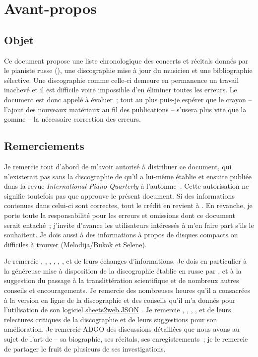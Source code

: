 \chapter[%
Avant-propos][%
Avant-propos]{%
Avant-propos}
\label{chap:Avant-propos}

\section{Objet}

Ce document propose une liste chronologique des concerts et récitals donnés
par le pianiste russe \VSofronitsky{} (), une
discographie mise à jour du musicien et une bibliographie sélective.
Une discographie comme celle-ci demeure en permanence un travail inachevé et
il est difficile voire impossible d'en éliminer toutes les erreurs.
Le document est donc appelé à évoluer~; tout au plus puis-je espérer que le
crayon -- l'ajout des nouveaux matériaux au fil des publications -- s'usera
plus vite que la gomme -- la nécessaire correction des erreurs.

\section{Remerciements}

Je remercie tout d'abord \FMalik{} de m'avoir autorisé à distribuer ce
document, qui n'existerait pas sans la discographie de \Sofronitsky{} qu'il
a lui-même établie et ensuite publiée dans la revue \emph{International
Piano Quarterly} à l'automne~\citeyear{Malik}.
Cette autorisation ne signifie toutefois pas que \FMalik{} approuve le
présent document.
Si des informations contenues dans celui-ci sont correctes, tout le crédit
en revient à \FMalik{}.
En revanche, je porte toute la responsabilité pour les erreurs et omissions
dont ce document serait entaché~; j'invite d'avance les utilisateurs
intéressés à m'en faire part s'ils le souhaitent.
Je dois aussi à \FMalik{} des informations à propos de disques compacts
 ou difficiles à trouver (Melodija/Bukok et Selene).

Je remercie \MMourgue{}, \MDupuy{}, \RQuonten{}, \DCordova{}, \ARossi{},
\FGiuntoli{}, \VVoskobojnikov{} et \KCuelenaere{} de leurs échanges
d'informations.
Je dois en particulier à \ARossi{} la généreuse mise à disposition de la
discographie établie en russe par \INikonovich{}
\citep[voir][]{Nikonovich11}, et à \FGiuntoli{} la suggestion du passage à
la translittération scientifique et de nombreux autres conseils et
encouragements.
Je remercie \KCuelenaere{} des nombreuses heures qu'il a consacrées à la
version en ligne de la discographie et des conseils qu'il m'a donnés pour
l'utilisation de son logiciel
\href{https://github.com/OhNoxius/sheets2web.JSON}{sheets2web.JSON}
\citep[voir][]{Cuelenaere}.
Je remercie \MDupuy{}, \RQuonten{}, \DCordova{}, \ARossi{}, \FGiuntoli{} et
\KCuelenaere{} de leurs relectures critiques de la discographie et de leurs
suggestions pour son amélioration.
Je remercie ADGO des discussions détaillées que nous avons au sujet de l'art
de \VSofronitsky{} -- sa biographie, ses récitals, ses enregistrements~; je
le remercie de partager le fruit de plusieurs de ses investigations.

